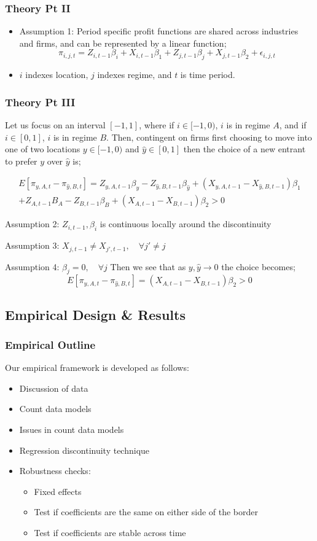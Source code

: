 \documentclass{beamer}
\begin{document}
\begin{frame}
\frametitle{Theory Pt II}
\begin{itemize}
\item Assumption 1: Period specific profit functions are shared across industries and firms, and can be represented by a linear function;
\begin{equation} \label{profit}
\pi_{i,j,t} =  Z_{i,t-1}\beta_{i}+X_{i,t-1}\beta_{1}+Z_{j,t-1}\beta_{j} + X_{j,t-1}\beta_{2}+\epsilon_{i,j,t}
\end{equation}
\item $i$ indexes location, $j$ indexes regime, and $t$ is time period.
\end{itemize}
\end{frame}

\begin{frame}
\frametitle{Theory Pt III}
Let us focus on an interval $[-1,1]$, where if $i \in [-1,0)$, $i$ is in regime $A$, and if $i \in [0,1]$, $i$ is in regime $B$. Then, contingent on firms first choosing to move into one of two locations $y \in [-1,0)$ and $\hat y \in [0,1]$ then the choice of a new entrant to prefer $y$ over $\hat y$ is;

\begin{multline*} E[\pi_{y,A,t}-\pi_{\hat y,B,t}] = Z_{y, A,t-1}\beta_{y}- Z_{\hat y, B,t-1}\beta_{\hat y}+(X_{y, A,t-1}-X_{\hat y, B,t-1})\beta_{1} \\ +Z_{A,t-1}B_{A}-Z_{B,t-1}\beta_{B} +(X_{A,t-1} - X_{B,t-1})\beta_{2} > 0 \end{multline*}

Assumption 2: $Z_{i,t-1}, \beta_{i}$ is continuous locally around the discontinuity

Assumption 3: $X_{j,t-1} \neq X_{j',t-1}, \quad \forall j' \neq j$

Assumption 4: $\beta_{j} = 0, \quad \forall j$
Then we see that as $y,\hat y \to 0$ the choice becomes;
$$ E[\pi_{y,A,t}-\pi_{\hat y,B,t}] = (X_{A,t-1}-X_{B,t-1})\beta_{2} > 0$$
\end{frame}


\begin{frame}
\section{Empirical Design \& Results}
\frametitle{Empirical Outline}
Our empirical framework is developed as follows:
\begin{itemize}
\item Discussion of data
\item Count data models
\item Issues in count data models
\item Regression discontinuity technique
\item Robustness checks: 
\begin{itemize}
\item Fixed effects
\item Test if coefficients are the same on either side of the border
\item Test if coefficients are stable across time
\end{itemize}
\end{itemize}
\end{frame}
\end{document}

